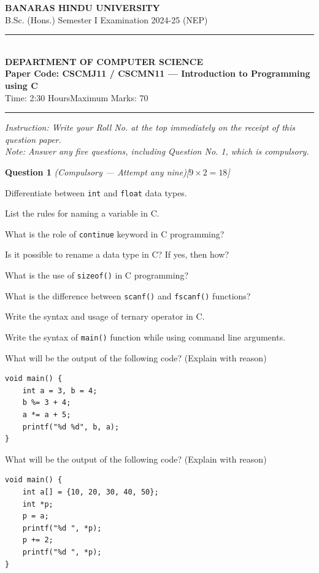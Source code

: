 \documentclass[11pt,a4paper]{article}
\newcommand{\pts}[1]{\hfill   \textit{[#1]}}
\begin{document}
\begin{center}
  {\large\bfseries BANARAS HINDU UNIVERSITY}\\[2pt]
  {\normalsize B.Sc. (Hons.) Semester I Examination 2024-25 (NEP)}\\[6pt]
  \rule{0.8\linewidth}{0.5pt}\\[6pt]
  {\large\bfseries DEPARTMENT OF COMPUTER SCIENCE}\\[4pt]
  {\large\bfseries Paper Code: CSCMJ11 / CSCMN11 --- Introduction to Programming using C}\\[4pt]
  {\normalsize Time: 2:30 Hours\hfill Maximum Marks: 70}
\end{center}

\rule{\linewidth}{0.4pt}\smallskip



\noindent   \textit{Instruction: Write your Roll No. at the top immediately on the receipt of this question paper.}\\[2pt]



\noindent   \textit{Note: Answer any five questions, including Question No. 1, which is compulsory.}
\bigskip




\noindent   \textbf{Question 1}   \textit{(Compulsory --- Attempt any nine)}\pts{$9  \times 2 = 18$}

\begin{parts}
  \item Differentiate between   \texttt{int} and   \texttt{float} data types.
  \item List the rules for naming a variable in C.
  \item What is the role of   \texttt{continue} keyword in C programming?
  \item Is it possible to rename a data type in C? If yes, then how?
  \item What is the use of   \texttt{sizeof()} in C programming?
  \item What is the difference between   \texttt{scanf()} and   \texttt{fscanf()} functions?
  \item Write the syntax and usage of ternary operator in C.
  \item Write the syntax of   \texttt{main()} function while using command line arguments.
  \item What will be the output of the following code? (Explain with reason)

\begin{lstlisting}
void main() {
    int a = 3, b = 4;
    b %= 3 + 4;
    a *= a + 5;
    printf("%d %d", b, a);
}
\end{lstlisting}
  \item What will be the output of the following code? (Explain with reason)

\begin{lstlisting}
void main() {
    int a[] = {10, 20, 30, 40, 50};
    int *p;
    p = a;
    printf("%d ", *p);
    p += 2;
    printf("%d ", *p);
}
\end{lstlisting}
\end{parts}
\end{document}
